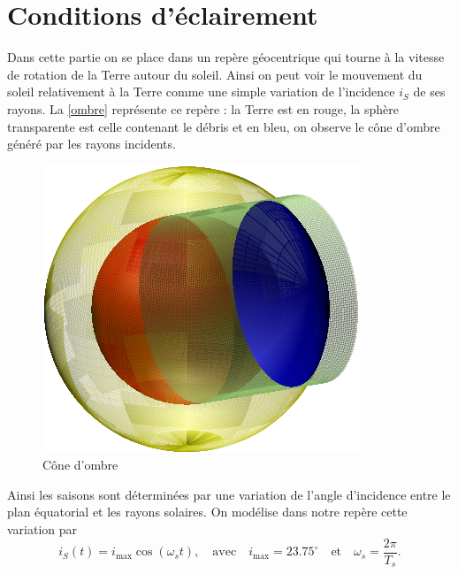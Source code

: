 \documentclass[a4paper,11pt]{article}
\numberwithin{section}{part}
\begin{document}










\section{Conditions d'\'eclairement}

Dans cette partie on se place dans un rep\`ere g\'eocentrique qui tourne \`a la vitesse de rotation de la Terre autour du soleil. Ainsi on peut voir le mouvement du soleil relativement \`a la Terre comme une simple variation de l'incidence $i_S$ de ses rayons.  La \autoref{ombre} repr\'esente ce rep\`ere : la Terre est en rouge, la sph\`ere transparente est celle contenant le d\'ebris et en bleu, on observe le c\^one d'ombre g\'en\'er\'e par les rayons incidents. 

 \begin{figure}[ht]
    \centering
    \includegraphics[width=.6\textwidth]{figures/ombre.pdf}
    \caption{C\^one d'ombre}\label{ombre}
 \end{figure}
 
Ainsi les saisons sont d\'etermin\'ees par une variation de l'angle d'incidence entre le plan \'equatorial et les rayons solaires.
On mod\'elise dans notre rep\`ere cette variation par 
\[ i_{S}(t)= i_{\max}\cos(\omega_{s}t), \quad \text{avec} \quad i_{\max}=23.75^\circ \quad \text{et}  \quad \omega_s=\frac{2\pi}{T_s}.\]
 
\end{document}
